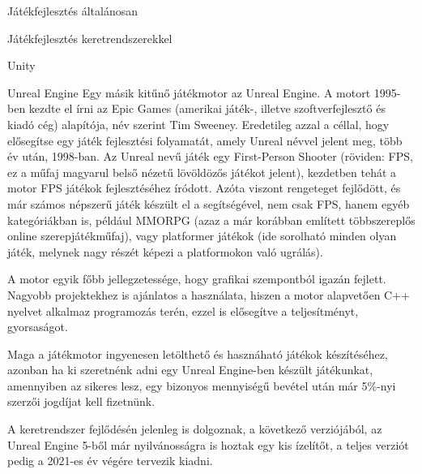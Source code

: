 \begin{MyChapter}{Játékfejlesztés általánosan}
\begin{MySection}{Játékfejlesztés keretrendszerekkel}
\begin{MySubSection}{Unity}
		\end{MySubSection}
		
		\begin{MySubSection}{Unreal Engine}
		Egy másik kitűnő játékmotor az Unreal Engine. A motort 1995-ben kezdte el írni az Epic Games (amerikai játék-, illetve szoftverfejlesztő és kiadó cég) alapítója, név szerint Tim Sweeney. Eredetileg azzal a céllal, hogy elősegítse egy játék fejlesztési folyamatát, amely Unreal névvel jelent meg, több év után, 1998-ban. Az Unreal nevű játék egy First-Person Shooter (röviden: FPS, ez a műfaj magyarul belső nézetű lövöldözős játékot jelent), kezdetben tehát a motor FPS játékok fejlesztéséhez íródott. Azóta viszont rengeteget fejlődött, és már számos népszerű játék készült el a segítségével, nem csak FPS, hanem egyéb kategóriákban is, például MMORPG (azaz a már korábban említett többszereplős online szerepjátékműfaj), vagy platformer játékok (ide sorolható minden olyan játék, melynek nagy részét képezi a platformokon való ugrálás).
		
		A motor egyik főbb jellegzetessége, hogy grafikai szempontból igazán fejlett. Nagyobb projektekhez is ajánlatos a használata, hiszen a motor alapvetően C++ nyelvet alkalmaz programozás terén, ezzel is elősegítve a teljesítményt, gyorsaságot.
		
		Maga a játékmotor ingyenesen letölthető és hasznáható játékok készítéséhez, azonban ha ki szeretnénk adni egy Unreal Engine-ben készült játékunkat, amennyiben az sikeres lesz, egy bizonyos mennyiségű bevétel után már 5\%-nyi szerzői jogdíjat kell fizetnünk.
		
		A keretrendszer fejlődésén jelenleg is dolgoznak, a következő verziójából, az Unreal Engine 5-ből már nyilvánosságra is hoztak egy kis ízelítőt, a teljes verziót pedig a 2021-es év végére tervezik kiadni.
		\cite{unity_vs_unreal}
		\cite{unreal_official_website}
		\cite{epic_games}
		\cite{platformers}
		

\end{MySubSection}
\end{MySection}
\end{MyChapter}
